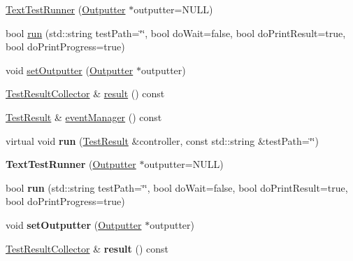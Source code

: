 \begin{DoxyCompactItemize}
\item 
\hyperlink{class_text_test_runner_ab91401ee0f35e84be5341afc21d55206}{Text\+Test\+Runner} (\hyperlink{class_outputter}{Outputter} $\ast$outputter=N\+U\+L\+L)
\item 
bool \hyperlink{class_text_test_runner_ad9c38c263202c2bd453b927ba53dcf48}{run} (std\+::string test\+Path=\char`\"{}\char`\"{}, bool do\+Wait=false, bool do\+Print\+Result=true, bool do\+Print\+Progress=true)
\item 
void \hyperlink{class_text_test_runner_a9d62d11f3acba355e47d21cb99106117}{set\+Outputter} (\hyperlink{class_outputter}{Outputter} $\ast$outputter)
\item 
\hyperlink{class_test_result_collector}{Test\+Result\+Collector} \& \hyperlink{class_text_test_runner_afd777921e79254ccca655245dc5dce67}{result} () const 
\item 
\hyperlink{class_test_result}{Test\+Result} \& \hyperlink{class_text_test_runner_a399452a89f16c4d68a0be8aa2ea4a3c6}{event\+Manager} () const 
\item 
\hypertarget{class_text_test_runner_a5f215d32151fc67e0374e83a5cd65e81}{virtual void {\bfseries run} (\hyperlink{class_test_result}{Test\+Result} \&controller, const std\+::string \&test\+Path=\char`\"{}\char`\"{})}\label{class_text_test_runner_a5f215d32151fc67e0374e83a5cd65e81}

\item 
\hypertarget{class_text_test_runner_ac7b6cba645a3a5e76382fcd40e4f7eb6}{{\bfseries Text\+Test\+Runner} (\hyperlink{class_outputter}{Outputter} $\ast$outputter=N\+U\+L\+L)}\label{class_text_test_runner_ac7b6cba645a3a5e76382fcd40e4f7eb6}

\item 
\hypertarget{class_text_test_runner_ad9c38c263202c2bd453b927ba53dcf48}{bool {\bfseries run} (std\+::string test\+Path=\char`\"{}\char`\"{}, bool do\+Wait=false, bool do\+Print\+Result=true, bool do\+Print\+Progress=true)}\label{class_text_test_runner_ad9c38c263202c2bd453b927ba53dcf48}

\item 
\hypertarget{class_text_test_runner_a9d62d11f3acba355e47d21cb99106117}{void {\bfseries set\+Outputter} (\hyperlink{class_outputter}{Outputter} $\ast$outputter)}\label{class_text_test_runner_a9d62d11f3acba355e47d21cb99106117}

\item 
\hypertarget{class_text_test_runner_a7a6cf866d23d621ed35474c8179b9b48}{\hyperlink{class_test_result_collector}{Test\+Result\+Collector} \& {\bfseries result} () const }\label{class_text_test_runner_a7a6cf866d23d621ed35474c8179b9b48}


\end{DoxyCompactItemize}
